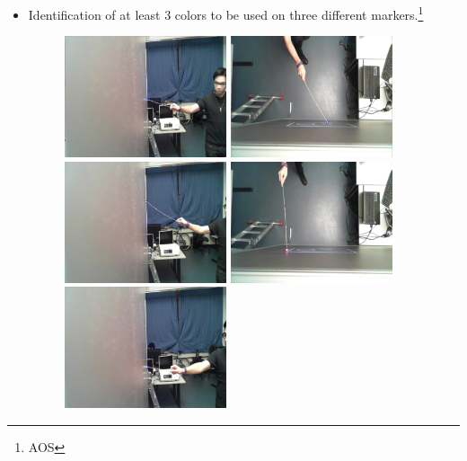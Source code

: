\documentclass[a4paper,12pt]{article}
\begin{document}
\begin{itemize}
\begin{figure}[H]
\begin{center}
	\label{fig:video}
    \end{center}
\end{figure}
\newpage
\item Identification of at least 3 colors to be used on three different markers.\footnote{AOS}
\begin{figure}[H]
    \begin{center}
	\includegraphics[width=0.45\textwidth]{MarkerSide}
	\includegraphics[width=0.45\textwidth]{MarkerUp}
	\includegraphics[width=0.45\textwidth]{RedSide}
	\includegraphics[width=0.45\textwidth]{RedUp}
	\includegraphics[width=0.45\textwidth]{GreenSide}

\end{center}
\end{figure}
\end{itemize}
\end{document}
